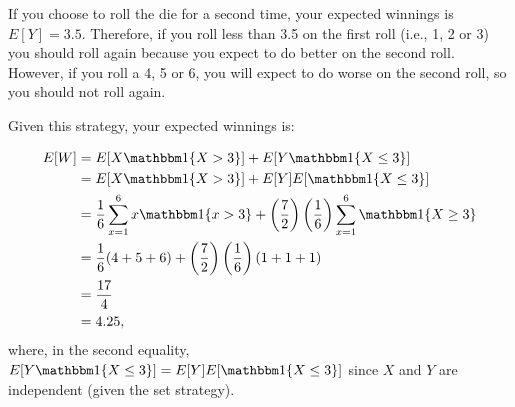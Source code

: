 \begin{problem}{24}  If you choose to roll the die for a second time, your expected winnings is $E[Y] = 3.5$.  Therefore, if you roll less than 3.5 on the first roll (i.e., 1, 2 or 3) you should roll again because you expect to do better on the second roll.  However, if you roll a 4, 5 or 6, you will expect to do worse on the second roll, so you should not roll again.

Given this strategy, your expected winnings is:

\begin{align*}
E[W] &= E[X \mathbbm 1\{ X>3\}]+E[Y \mathbbm 1\{ X \le 3\}] \\
& = E[X \mathbbm 1\{ X>3\}]+E[Y]E[ \mathbbm 1\{ X \le 3\}] \\
& = \frac{1}{6}\sum_{x=1}^6 x \mathbbm 1\{ x>3\}+\left(\frac{7}{2}\right) \left(\frac{1}{6}\right)\sum_{x=1}^6 \mathbbm 1\{ X \ge 3 \} \\
& = \frac{1}{6} (4+5+6)+\left(\frac{7}{2}\right) \left(\frac{1}{6}\right) (1+1+1) \\
&= \frac{17}{4} \\
&= 4.25,
\end{align*}
where, in the second equality, $E[Y \mathbbm 1\{ X \le 3\}]  = E[Y]E[ \mathbbm 1\{ X \le 3\}] $ since $X$ and $Y$ are independent (given the set strategy).  

\end{problem}

